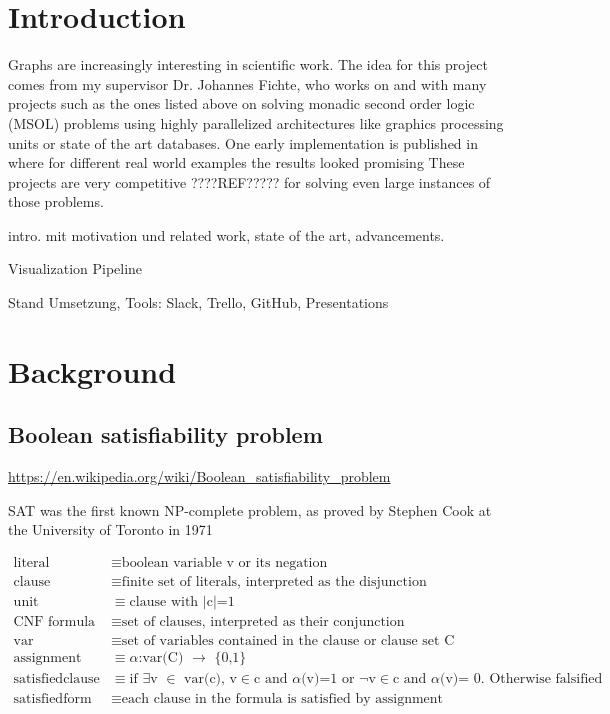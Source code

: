 \documentclass[a4paper, 12pt]{scrartcl}
\begin{document}
\newpage

\tableofcontents

\newpage


\section{Introduction}
Graphs are increasingly interesting in scientific work.
The idea for this project comes from my supervisor Dr. Johannes Fichte, who works on and with many projects such as the ones listed above on solving monadic second order logic (MSOL\cite{Courcelle2012}) problems using highly parallelized architectures like graphics processing units or state of the art databases.
One early implementation is published in \cite{evaluationMSO} where for different real world examples the results looked promising
These projects are very competitive ????REF????? for solving even large instances of those problems.

intro. mit motivation und related work, state of the art, advancements.


Visualization Pipeline

Stand Umsetzung, Tools: Slack, Trello, GitHub, Presentations

\newpage
\section{Background}

\subsection{Boolean satisfiability problem}
\url{https://en.wikipedia.org/wiki/Boolean_satisfiability_problem}

SAT was the first known NP-complete problem, as proved by Stephen Cook at the University of Toronto in 1971 \cite{SAT1971}

\begin{align*}
\text{literal}&\equiv\text{boolean variable v or its negation} \\
\text{clause}&\equiv\text{finite set of literals, interpreted as the disjunction} \\
\text{unit}&\equiv\text{clause with $|$c$|$=1} \\
\text{CNF formula}&\equiv\text{set of clauses, interpreted as their conjunction} \\
\text{var}&\equiv\text{set of variables contained in the clause or clause set C} \\
\text{assignment}&\equiv \text{$\alpha $:var(C) $\to $ \{0,1\}} \\
\text{satisfiedclause}&\equiv\text{if $\exists $v $\in $ var(c), v$\in $c and $\alpha $(v)=1 or $\neg $v$\in $c and $\alpha $(v)= 0. Otherwise falsified}\\ 
\text{satisfiedform}&\equiv\text{each clause in the formula is satisfied by assignment} \\
\end{align*}
\end{document}
